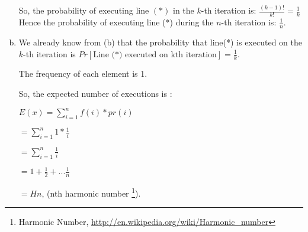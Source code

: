 \begin{enumerate}[(a)]
	So, the probability of executing line $(*)$ in the $k$-th iteration is: $\frac{(k-1)!}{k!} = \frac{1}{k}$
	Hence the probability of executing line (*) during the $n$-th iteration is: $\frac{1}{n}$.
	
	\item
	
	We already know from (b) that the probability that line(*) is executed on the $k$-th iteration is 
	$Pr[\text{Line (*) executed on kth iteration}] = \frac{1}{k}$.
	
	The frequency of each element is 1.
	
	So, the expected number of executions is :
	
	$ E(x) = \sum\limits_{i=1}^n f(i) * pr(i)$
	
       $ = \sum\limits_{i=1}^n 1 * \frac{1}{i} $
       
       $ = \sum\limits_{i=1}^n \frac{1}{i} $
	
	$ = 1 + \frac{1}{2} + ... \frac{1}{n} $
	
	$ = Hn$, (nth harmonic number \footnote{Harmonic Number, \url{http://en.wikipedia.org/wiki/Harmonic_number}}).

\end{enumerate}
